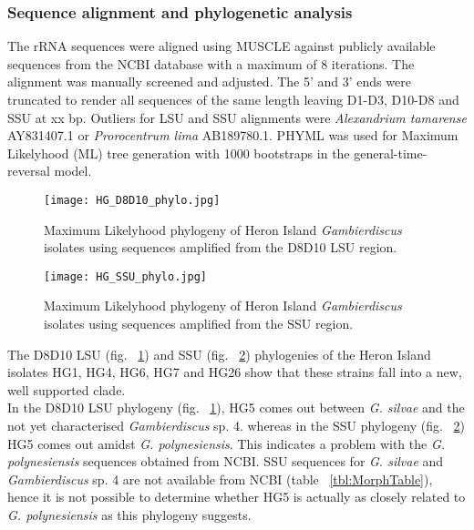 \documentclass[12pt]{article}
\begin{document}
\FloatBarrier

\subsubsection{Sequence alignment and phylogenetic analysis}
The rRNA sequences were aligned using MUSCLE against publicly available sequences from the NCBI database with a maximum of 8 iterations. The alignment was manually screened and adjusted. The 5' and 3' ends were truncated to render all sequences of the same length leaving D1-D3, D10-D8 and SSU at xx bp. Outliers for LSU and SSU alignments were \emph{Alexandrium tamarense} AY831407.1 or \emph{Prorocentrum lima} AB189780.1.
PHYML was used for Maximum Likelyhood (ML) tree generation with 1000 bootstraps in the general-time-reversal model. \\



\begin{figure} 
\texttt{[image: HG\_D8D10\_phylo.jpg]} 
\caption{Maximum Likelyhood phylogeny of Heron Island \textit{Gambierdiscus} isolates using sequences amplified from the D8D10 LSU region.} 
\label{fig:HGD8D10}
\end{figure} 
\FloatBarrier 
\newpage

\begin{figure} 
\texttt{[image: HG\_SSU\_phylo.jpg]} 
\caption{Maximum Likelyhood phylogeny of Heron Island \textit{Gambierdiscus} isolates using sequences amplified from the SSU region.}
\label{fig:HGSSU} 
\end{figure} 
\FloatBarrier 
\newpage

The D8D10 LSU (fig. ~\ref{fig:HGD8D10}) and SSU (fig. ~\ref{fig:HGSSU}) phylogenies of the Heron Island isolates HG1, HG4, HG6, HG7 and HG26 show that these strains fall into a new, well supported clade.\\
In the D8D10 LSU phylogeny (fig. ~\ref{fig:HGD8D10}), HG5 comes out between \emph{G. silvae} and the not yet characterised \emph{Gambierdiscus} sp. 4. whereas in the SSU phylogeny (fig. ~\ref{fig:HGSSU}) HG5 comes out amidst \emph{G. polynesiensis}. This indicates a problem with the \emph{G. polynesiensis} sequences obtained from NCBI. SSU sequences for \emph{G. silvae} and \emph{Gambierdiscus} sp. 4 are not available from NCBI (table ~\ref{tbl:MorphTable}), hence it is not possible to determine whether HG5 is actually as closely related to \emph{G. polynesiensis} as this phylogeny suggests.\\
\end{document}
